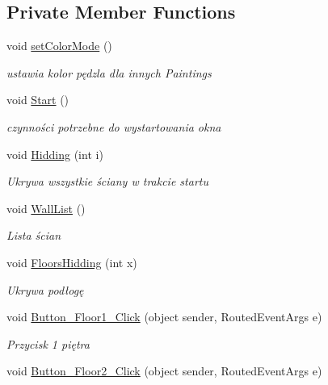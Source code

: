 \subsection*{Private Member Functions}
\begin{DoxyCompactItemize}
\item 
void \mbox{\hyperlink{class_r6_1_1_border_window_a8b03994a86c5669bb1cd8f8b1e7f4cfc}{set\+Color\+Mode}} ()
\begin{DoxyCompactList}\small\item\em ustawia kolor pędzla dla innych Paintings \end{DoxyCompactList}\item 
void \mbox{\hyperlink{class_r6_1_1_border_window_a877d358b0f63cb293a1ea410865d83b5}{Start}} ()
\begin{DoxyCompactList}\small\item\em czynności potrzebne do wystartowania okna \end{DoxyCompactList}\item 
void \mbox{\hyperlink{class_r6_1_1_border_window_a1591a1aa79f9d222f796e1016a5fa896}{Hidding}} (int i)
\begin{DoxyCompactList}\small\item\em Ukrywa wszystkie ściany w trakcie startu \end{DoxyCompactList}\item 
void \mbox{\hyperlink{class_r6_1_1_border_window_a9c3e58b6cbed9a315c21c96b90ba1afc}{Wall\+List}} ()
\begin{DoxyCompactList}\small\item\em Lista ścian \end{DoxyCompactList}\item 
void \mbox{\hyperlink{class_r6_1_1_border_window_a359413bf0662feeeb3caa09a7226a139}{Floors\+Hidding}} (int x)
\begin{DoxyCompactList}\small\item\em Ukrywa podłogę \end{DoxyCompactList}\item 
void \mbox{\hyperlink{class_r6_1_1_border_window_a3b311ca9574273854d443a4db07b3af3}{Button\+\_\+\+Floor1\+\_\+\+Click}} (object sender, Routed\+Event\+Args e)
\begin{DoxyCompactList}\small\item\em Przycisk 1 piętra \end{DoxyCompactList}\item 
void \mbox{\hyperlink{class_r6_1_1_border_window_a6f3bb94485f373bb58049c1d7af5d13d}{Button\+\_\+\+Floor2\+\_\+\+Click}} (object sender, Routed\+Event\+Args e)

\end{DoxyCompactItemize}
